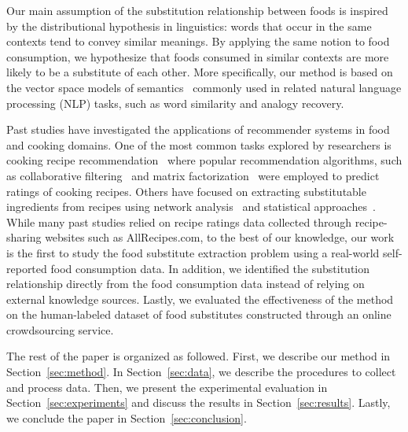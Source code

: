 Our main assumption of the substitution relationship between foods is inspired by the distributional hypothesis in linguistics: words that occur in the same contexts tend to convey similar meanings. By applying the same notion to food consumption, we hypothesize that foods consumed in similar contexts are more likely to be a substitute of each other. More specifically, our method is based on the vector space models of semantics~\cite{Turney2010} commonly used in related natural language processing (NLP) tasks, such as word similarity and analogy recovery.

Past studies have investigated the applications of recommender systems in food and cooking domains. One of the most common tasks explored by researchers is cooking recipe recommendation~\cite{Freyne:2010:IFP:1719970.1720021, Harvey2013, Ge2015} where popular recommendation algorithms, such as collaborative filtering~\cite{Freyne:2010:IFP:1719970.1720021} and matrix factorization~\cite{Harvey2013, Ge2015} were employed to predict ratings of cooking recipes. Others have focused on extracting substitutable ingredients from recipes using network analysis~\cite{Teng2012} and statistical approaches~\cite{ Boscarino2014}. While many past studies relied on recipe ratings data collected through recipe-sharing websites such as AllRecipes.com, to the best of our knowledge, our work is the first to study the food substitute extraction problem using a real-world self-reported food consumption data. In addition, we identified the substitution relationship directly from the food consumption data instead of relying on external knowledge sources\cite{Teng2012, Boscarino2014}. Lastly, we evaluated the effectiveness of the method on the human-labeled dataset of food substitutes constructed through an online crowdsourcing service.

The rest of the paper is organized as followed. First, we describe our method in Section~\ref{sec:method}. In Section~\ref{sec:data}, we describe the procedures to collect and process data. Then, we present the experimental evaluation in Section~\ref{sec:experiments} and discuss the results in Section~\ref{sec:results}. Lastly, we conclude the paper in Section~\ref{sec:conclusion}.









%

